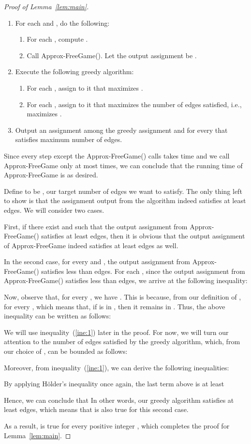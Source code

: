 \documentclass{article}
\begin{document}
\begin{proof}[Proof of Lemma~\ref{lem:main}]
\begin{enumerate}
\item For each  and , do the following:
  \begin{enumerate}
  \item For each , compute .
  \item Call {\sc Approx-FreeGame}(). Let the output assignment be .
  \end{enumerate}
\item Execute the following greedy algorithm:
  \begin{enumerate}
  \item For each , assign  to it that maximizes . \label{step:free-greedy}
  \item For each , assign  to it that maximizes the number of edges satisfied, i.e., maximizes .
  \end{enumerate}
\item Output an assignment among the greedy assignment and  for every  that satisfies maximum number of edges.
\end{enumerate}

Since every step except the {\sc Approx-FreeGame}() calls takes  time and we call {\sc Approx-FreeGame} only at most  times, we can conclude that the running time of {\sc Approx-FreeGame} is  as desired.

Define  to be , our target number of edges we want to satisfy. The only thing left to show is that the assignment output from the algorithm indeed satisfies at least  edges. We will consider two cases.

First, if there exist  and  such that the output assignment from {\sc Approx-FreeGame}() satisfies at least  edges, then it is obvious that the output assignment of {\sc Approx-FreeGame} indeed satisfies at least  edges as well.

In the second case, for every  and , the output assignment from {\sc Approx-FreeGame}() satisfies less than  edges. For each , since the output assignment from {\sc Approx-FreeGame}() satisfies less than  edges, we arrive at the following inequality:


Now, observe that, for every , we have . This is because, from our definition of ,  for every , which means that, if  is in , then it remains in . Thus, the above inequality can be written as follows:


We will use inequality~(\ref{ine:1}) later in the proof. For now, we will turn our attention to the number of edges satisfied by the greedy algorithm, which, from our choice of , can be bounded as follows:


Moreover, from inequality~(\ref{ine:1}), we can derive the following inequalities:


By applying H\"{o}lder's inequality once again, the last term above is at least


Hence, we can conclude that  In other words, our greedy algorithm satisfies at least  edges, which means that  is also true for this second case.

As a result,  is true for every positive integer , which completes the proof for Lemma~\ref{lem:main}.
\end{proof}
\end{document}
